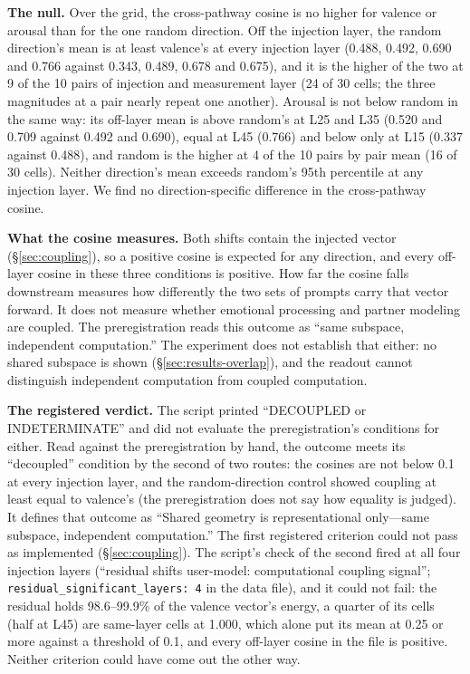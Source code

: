 \documentclass[11pt,a4paper]{article}
\begin{document}
\textbf{The null.} Over the grid, the cross-pathway cosine is no higher for valence or arousal than for the one random direction. Off the injection layer, the random direction's mean is at least valence's at every injection layer (0.488, 0.492, 0.690 and 0.766 against 0.343, 0.489, 0.678 and 0.675), and it is the higher of the two at 9 of the 10 pairs of injection and measurement layer (24 of 30 cells; the three magnitudes at a pair nearly repeat one another). Arousal is not below random in the same way: its off-layer mean is above random's at L25 and L35 (0.520 and 0.709 against 0.492 and 0.690), equal at L45 (0.766) and below only at L15 (0.337 against 0.488), and random is the higher at 4 of the 10 pairs by pair mean (16 of 30 cells). Neither direction's mean exceeds random's 95th percentile at any injection layer. We find no direction-specific difference in the cross-pathway cosine.

\textbf{What the cosine measures.} Both shifts contain the injected vector (\S\ref{sec:coupling}), so a positive cosine is expected for any direction, and every off-layer cosine in these three conditions is positive. How far the cosine falls downstream measures how differently the two sets of prompts carry that vector forward. It does not measure whether emotional processing and partner modeling are coupled. The preregistration reads this outcome as ``same subspace, independent computation.'' The experiment does not establish that either: no shared subspace is shown (\S\ref{sec:results-overlap}), and the readout cannot distinguish independent computation from coupled computation.

\textbf{The registered verdict.} The script printed ``DECOUPLED or INDETERMINATE'' and did not evaluate the preregistration's conditions for either. Read against the preregistration by hand, the outcome meets its ``decoupled'' condition by the second of two routes: the cosines are not below 0.1 at every injection layer, and the random-direction control showed coupling at least equal to valence's (the preregistration does not say how equality is judged). It defines that outcome as ``Shared geometry is representational only---same subspace, independent computation.'' The first registered criterion could not pass as implemented (\S\ref{sec:coupling}). The script's check of the second fired at all four injection layers (``residual shifts user-model: computational coupling signal''; \texttt{residual\_significant\_layers: 4} in the data file), and it could not fail: the residual holds 98.6--99.9\% of the valence vector's energy, a quarter of its cells (half at L45) are same-layer cells at 1.000, which alone put its mean at 0.25 or more against a threshold of 0.1, and every off-layer cosine in the file is positive. Neither criterion could have come out the other way.
\end{document}
